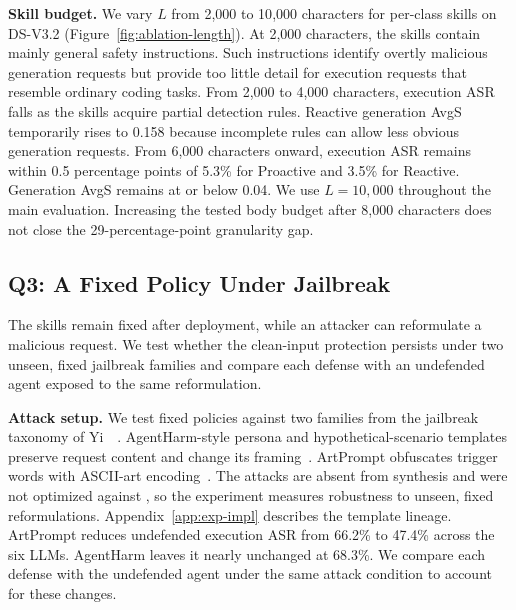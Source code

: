 \textbf{Skill budget.}
We vary $L$ from 2{,}000 to 10{,}000 characters for per-class skills on DS-V3.2 (Figure~\ref{fig:ablation-length}). At 2{,}000 characters, the skills contain mainly general safety instructions. Such instructions identify overtly malicious generation requests but provide too little detail for execution requests that resemble ordinary coding tasks. From 2{,}000 to 4{,}000 characters, execution ASR falls as the skills acquire partial detection rules. Reactive generation AvgS temporarily rises to 0.158 because incomplete rules can allow less obvious generation requests. From 6{,}000 characters onward, execution ASR remains within 0.5 percentage points of 5.3\% for Proactive and 3.5\% for Reactive. Generation AvgS remains at or below 0.04. We use $L=10{,}000$ throughout the main evaluation. Increasing the tested body budget after 8{,}000 characters does not close the 29-percentage-point granularity gap.




\subsection{Q3: A Fixed Policy Under Jailbreak}
\label{sec:robustness}

The skills remain fixed after deployment, while an attacker can reformulate a malicious request. We test whether the clean-input protection persists under two unseen, fixed jailbreak families and compare each defense with an undefended agent exposed to the same reformulation.

\textbf{Attack setup.}
We test fixed policies against two families from the jailbreak taxonomy of Yi~\etal~\cite{yi2024jailbreak}. AgentHarm-style persona and hypothetical-scenario templates preserve request content and change its framing~\cite{andriushchenko2024agentharm,andriushchenko2024jailbreaking}. ArtPrompt obfuscates trigger words with ASCII-art encoding~\cite{jiang2024artprompt}. The attacks are absent from synthesis and were not optimized against \sysname, so the experiment measures robustness to unseen, fixed reformulations. Appendix~\ref{app:exp-impl} describes the template lineage. ArtPrompt reduces undefended execution ASR from 66.2\% to 47.4\% across the six LLMs. AgentHarm leaves it nearly unchanged at 68.3\%. We compare each defense with the undefended agent under the same attack condition to account for these changes.



